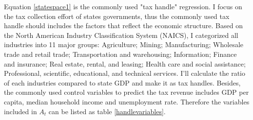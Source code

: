 Equation \ref{statespace1} is the commonly used "tax handle" regression. I focus on the tax collection effort of states governments, thus the commonly used tax handle should includes the factors that reflect the economic structure. Based on the North American Industry Classification System (NAICS), I categorized all industries into 11 major groups: Agriculture; Mining; Manufacturing; Wholesale trade and retail trade; Transportation and warehousing; Information; Finance and insurance; Real estate, rental, and leasing; Health care and social assistance; Professional, scientific, educational, and technical services. I'll calculate the ratio of each industries compared to state GDP and make it as tax handles. Besides, the commonly used control variables to predict the tax revenue includes GDP per capita, median household income and unemployment rate. Therefore the variables included in $A_t$ can be listed as table \ref{handlevariables}.
